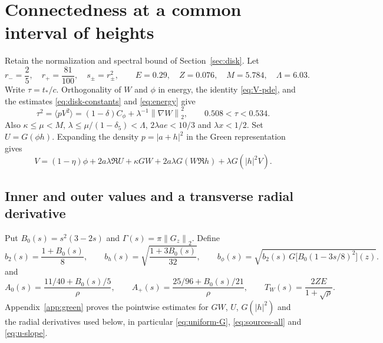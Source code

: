 \documentclass[11pt,a4paper,reqno]{amsart}
\theoremstyle{remark}
\numberwithin{equation}{section}
\newcommand{\davg}[1]{\langle #1\rangle}
\newcommand{\norm}[1]{\left\|#1\right\|_2}
\newcommand{\Cphi}{C_\phi}
\begin{document}
\section{Connectedness at a common interval of heights}\label{sec:levels}
Retain the normalization and spectral bound of Section~\ref{sec:disk}. Let
\[
  r_-=\frac25,\quad r_+=\frac{81}{100},\quad s_\pm=r_\pm^2,\qquad
  E=0.29,\quad Z=0.076,\quad M=5.784,\quad \Lambda=6.03.
\]
Write $\tau=t_*/c$. Orthogonality of $W$ and $\phi$ in energy, the identity
\eqref{eq:V-pde}, and the estimates \eqref{eq:disk-constants} and
\eqref{eq:energy} give
\begin{equation}\label{eq:tau}
  \tau^2=\davg{pV^2}=(1-\delta)\Cphi+\lambda^{-1}\norm{\nabla W}^2,
  \qquad
  0.508<\tau<0.534.
\end{equation}
Also $\kappa\le\mu<M$, $\lambda\le\mu/(1-\delta_5)<\Lambda$,
$2\lambda ae<10/3$ and $\lambda x<1/2$. Set $U=G(\phi h)$.
Expanding the density $p=|a+h|^2$ in the Green representation gives
\begin{equation}\label{eq:green}
  V=(1-\eta)\phi+2a\lambda\Re U+\kappa GW+2a\lambda G(W\Re h)+\lambda G(|h|^2 V).
\end{equation}

\subsection{Inner and outer values and a transverse radial derivative}
Put $B_0(s)=s^2(3-2s)$ and $\Gamma(s)=\pi\norm{G_z}$. Define
\[
  b_2(s)=\frac{1+B_0(s)}{8},\qquad
  b_h(s)=\sqrt{\frac{1+3B_0(s)}{32}},\qquad
  b_\phi(s)=\sqrt{b_2(s)\,G\bigl[B_0(1-3s/8)^2\bigr](z)}.
\]
and
\[
  A_0(s)=\frac{11/40+B_0(s)/5}{\rho},\qquad
  A_+(s)=\frac{25/96+B_0(s)/21}{\rho},\qquad
  T_W(s)=\frac{2ZE}{1+\sqrt\rho}.
\]
Appendix~\ref{app:green} proves the pointwise estimates for $GW$, $U$,
$G(|h|^2)$ and the radial derivatives used below, in particular
\eqref{eq:uniform-G}, \eqref{eq:sources-all} and \eqref{eq:u-slope}.
\end{document}
